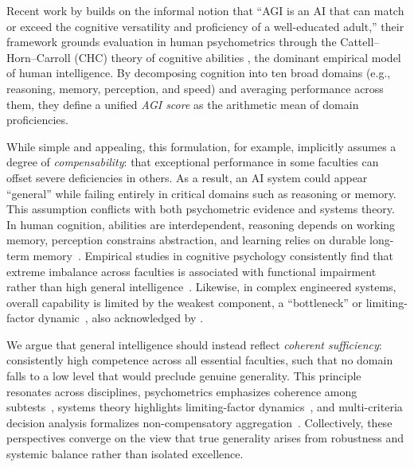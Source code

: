 \documentclass{article}
\begin{document}
Recent work by \cite{hendrycks2025agidefinition} builds on the informal notion that “AGI is an AI that can match or exceed the cognitive versatility and proficiency of a well-educated adult,” their framework grounds evaluation in human psychometrics through the Cattell--Horn--Carroll (CHC) theory of cognitive abilities \citep{carroll1993human,mcgrew2009chc,mcgrew2023carroll}, the dominant empirical model of human intelligence. By decomposing cognition into ten broad domains (e.g., reasoning, memory, perception, and speed) and averaging performance across them, they define a unified \emph{AGI score} as the arithmetic mean of domain proficiencies.


While simple and appealing, this formulation, for example, implicitly assumes a degree of \emph{compensability}: that exceptional performance in some faculties can offset severe deficiencies in others. As a result, an AI system could appear ``general'' while failing entirely in critical domains such as reasoning or memory. This assumption conflicts with both psychometric evidence and systems theory. In human cognition, abilities are interdependent, reasoning depends on working memory, perception constrains abstraction, and learning relies on durable long-term memory~\citep{carroll1993human,mcgrew2009chc,mcgrew2023carroll}. Empirical studies in cognitive psychology consistently find that extreme imbalance across faculties is associated with functional impairment rather than high general intelligence~\citep{cattell1987intelligence}. Likewise, in complex engineered systems, overall capability is limited by the weakest component, a ``bottleneck'' or limiting-factor dynamic~\citep{keeney1993decisions,kitano2004biological}, also acknowledged by \cite{hendrycks2025agidefinition}.



We argue that general intelligence should instead reflect \emph{coherent sufficiency}: consistently high competence across all essential faculties, such that no domain falls to a low level that would preclude genuine generality. This principle resonates across disciplines, psychometrics emphasizes coherence among subtests~\cite{carroll1993human,mcgrew2009chc}, systems theory highlights limiting-factor dynamics~\cite{kitano2004biological}, and multi-criteria decision analysis formalizes non-compensatory aggregation~\cite{keeney1993decisions}. Collectively, these perspectives converge on the view that true generality arises from robustness and systemic balance rather than isolated excellence.
\end{document}
